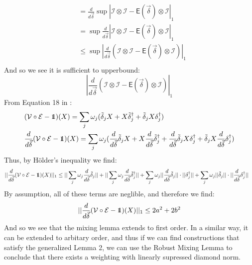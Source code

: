 \documentclass[aps,nofootinbib,pra,notitlepage,twocolumn]{revtex4-1}
\newcommand{\deriv}[0]{{\frac{d}{d\vec{\delta}}}}
\newcommand{\error}{\ensuremath{{\mathsf{E}}}}
\def\id{\mbox{\small 1} \!\! \mbox{1}}
\begin{document}
\begin{align}
&= \deriv\sup|\mathcal{I}\otimes\mathcal{I}-\error(\vec{\delta})\otimes\mathcal{I}|_1 \\
&= \sup\deriv|\mathcal{I}\otimes\mathcal{I}-\error(\vec{\delta})\otimes\mathcal{I}|_1 \\
&\leq \sup|\deriv(\mathcal{I}\otimes\mathcal{I}-\error(\vec{\delta})\otimes\mathcal{I})|_1 \\
\end{align}
And so we see it is sufficient to upperbound:
\begin{equation}
|\deriv(\mathcal{I}\otimes\mathcal{I}-\error(\vec{\delta})\otimes\mathcal{I})|_1
\end{equation}
From Equation 18 in \cite{Campbell2017}:
\begin{align}
&(\mathcal{V}\circ\mathcal{E} - \id)(X) = \sum_j \omega_j(\tilde{\delta}_jX + X\tilde{\delta}_j^{\dagger} + \tilde{\delta}_jX\delta_j^{\dagger})\\
&\deriv(\mathcal{V}\circ\mathcal{E} - \id)(X) = \sum_j \omega_j(\deriv\tilde{\delta}_jX + X\deriv\tilde{\delta}_j^{\dagger} + \deriv\tilde{\delta}_jX\delta_j^{\dagger} + \tilde{\delta}_jX\deriv\delta_j^{\dagger})\\
\end{align}
Thus, by H\"older's inequality we find:
\begin{align}
&||\deriv(\mathcal{V}\circ\mathcal{E} - \id)(X)||_1\leq||\sum_j \omega_j\deriv\tilde{\delta}_j|| + ||\sum_j\omega_j\deriv\tilde{\delta}_j^{\dagger}|| + \sum_j\omega_j|| \deriv\tilde{\delta}_j||\cdot||\delta_j^{\dagger}|| + \sum_j\omega_j||\tilde{\delta}_j||\cdot||\deriv\delta_j^{\dagger}||
\end{align}
By assumption, all of these terms are neglible, and therefore we find:
\begin{align}
||\deriv(\mathcal{V}\circ\mathcal{E} - \id)(X)||_1\leq 2a^2 + 2b^2
\end{align}
And so we see that the mixing lemma extends to first order. In a similar way, it can be extended to arbitary order, and thus if we can find constructions that satisfy the generalized Lemma 2, we can use the Robust Mixing Lemma to conclude that there exists a weighting with linearly supressed diamond norm.
\end{document}
